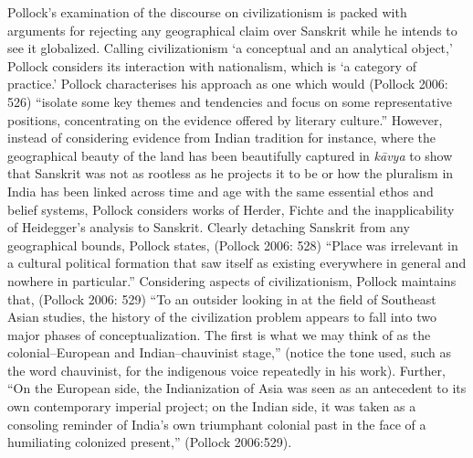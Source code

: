 Pollock’s examination of the discourse on civilizationism is packed with arguments for rejecting any geographical claim over Sanskrit while he intends to see it globalized. Calling civilizationism ‘a conceptual and an analytical object,’ Pollock considers its interaction with nationalism, which is ‘a category of practice.’ Pollock characterises his approach as one which would (Pollock 2006: 526) “isolate some key themes and tendencies and focus on some representative positions, concentrating on the evidence offered by literary culture.” However, instead of considering evidence from Indian tradition for instance, where the geographical beauty of the land has been beautifully captured in \textit{kāvya} to show that Sanskrit was not as rootless as he projects it to be or how the pluralism in India has been linked across time and age with the same essential ethos and belief systems, Pollock considers works of Herder, Fichte and the inapplicability of Heidegger’s analysis to Sanskrit. Clearly detaching Sanskrit from any geographical bounds, Pollock states, (Pollock 2006: 528) “Place was irrelevant in a cultural political formation that saw itself as existing everywhere in general and nowhere in particular.” Considering aspects of civilizationism, Pollock maintains that, (Pollock 2006: 529) “To an outsider looking in at the field of Southeast Asian studies, the history of the civilization problem appears to fall into two major phases of conceptualization. The first is what we may think of as the colonial–European and Indian–chauvinist stage,” (notice the tone used, such as the word chauvinist, for the indigenous voice repeatedly in his work). Further, “On the European side, the Indianization of Asia was seen as an antecedent to its own contemporary imperial project; on the Indian side, it was taken as a consoling reminder of India’s own triumphant colonial past in the face of a humiliating colonized present,” (Pollock 2006:529).

